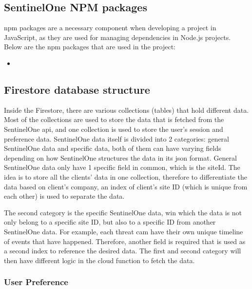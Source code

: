 \begin{multicols}{2}

  \subsection{SentinelOne NPM packages}
  \acrshort{npm} packages are a necessary component when developing a project in JavaScript, as they are used for managing dependencies
  in Node.js projects. Below are the \acrshort{npm} packages that are used in the project:

  \begin{itemize}
    \item
  \end{itemize}


  \subsection{Firestore database structure}

  Inside the Firestore, there are various collections (tables) that hold different data. Most of the collections are used to store the
  data that is fetched from the SentinelOne \acrshort{api}, and one collection is used to store the user's session and preference data.
  SentinelOne data itself is divided into 2 categories: general SentinelOne data and specific data, both of them can have varying fields
  depending on how SentinelOne structures the data in its \acrshort{json} format. General SentinelOne data only have 1 specific field
  in common, which is the siteId. The idea is to store all the clients' data in one collection, therefore to differentiate the data
  based on client's company, an index of client's site ID (which is unique from each other) is used to separate the data.

  The second category is the specific SentinelOne data, win which the data is not only belong to a specific site ID, but also to a
  specific ID from another SentinelOne data. For example, each threat cam have their own unique timeline of events that have happened.
  Therefore, another field is required that is used as a second index to reference the desired data. The first and second category will
  then have different logic in the cloud function to fetch the data.

  \subsubsection{User Preference}


\end{multicols}
